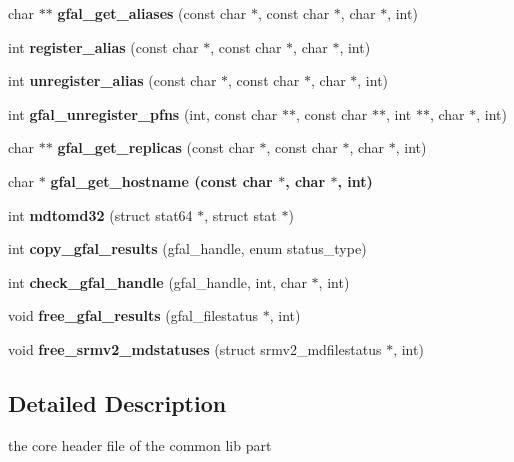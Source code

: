 \begin{CompactItemize}
\item 
char $\ast$$\ast$ \textbf{gfal\_\-get\_\-aliases} (const char $\ast$, const char $\ast$, char $\ast$, int)\label{group__internal__group_g25d4ae6bef6570590efbc8548e7d79e2}

\item 
int \textbf{register\_\-alias} (const char $\ast$, const char $\ast$, char $\ast$, int)\label{gfal__common_8h_8a3be4d56dcedebe98cf84e8d5082782}

\item 
int \textbf{unregister\_\-alias} (const char $\ast$, const char $\ast$, char $\ast$, int)\label{gfal__common_8h_2483d66384257fdbe3b1fd6c568709b8}

\item 
int \textbf{gfal\_\-unregister\_\-pfns} (int, const char $\ast$$\ast$, const char $\ast$$\ast$, int $\ast$$\ast$, char $\ast$, int)\label{group__internal__group_g70f889fa2436723fb7b3cff20b661f21}

\item 
char $\ast$$\ast$ \textbf{gfal\_\-get\_\-replicas} (const char $\ast$, const char $\ast$, char $\ast$, int)\label{group__internal__group_gbd0a581309f65e07a5e28d442f07b169}

\item 
char $\ast$ \bf{gfal\_\-get\_\-hostname} (const char $\ast$, char $\ast$, int)
\item 
int \textbf{mdtomd32} (struct stat64 $\ast$, struct stat $\ast$)\label{gfal__common_8h_279a394776e983460b0dc373238bbdeb}

\item 
int \textbf{copy\_\-gfal\_\-results} (gfal\_\-handle, enum status\_\-type)\label{gfal__common_8h_226eb7c7688af01a84b243e831f4af77}

\item 
int \textbf{check\_\-gfal\_\-handle} (gfal\_\-handle, int, char $\ast$, int)\label{gfal__common_8h_74b7456978e7b4059473733755d71b85}

\item 
void \textbf{free\_\-gfal\_\-results} (gfal\_\-filestatus $\ast$, int)\label{gfal__common_8h_912fe2b722650ab952e78a8c44e28660}

\item 
void \textbf{free\_\-srmv2\_\-mdstatuses} (struct srmv2\_\-mdfilestatus $\ast$, int)\label{gfal__common_8h_00141b129093611da15bab0cee7fc196}

\end{CompactItemize}


\subsection{Detailed Description}
the core header file of the common lib part 

